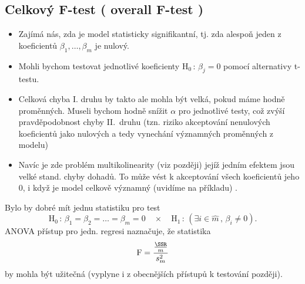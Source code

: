 \subsection{Celkový F-test ( overall F-test )}

\begin{itemize}
\item Zajímá nás, zda je model statisticky signifikantní, tj. zda alespoň jeden z koeficientů $ \beta_1 , \dots , \beta_m $ je nulový.
\item Mohli bychom testovat jednotlivé koeficienty $ \text{H}_0 \, : \, \beta_j = 0 $ pomocí alternativy t-testu.
\item Celková chyba I. druhu by takto ale mohla být velká, pokud máme hodně proměnných. Museli bychom hodně snížit $ \alpha $ pro jednotlivé testy, což zvýší pravděpodobnost chyby II.~druhu (tzn. riziko akceptování nenulových koeficientů jako nulových a tedy vynechání významných proměnných z modelu)
\item Navíc je zde problém multikolinearity (viz později) jejíž jedním efektem jsou velké stand. chyby dohadů. To může vést k akceptování všech koeficientů jeho 0, i když je model celkově významný (uvidíme na příkladu) .
\end{itemize}

Bylo by dobré mít jednu statistiku pro test
$$
\text{H}_0 \, : \, \beta_1 = \beta_2 = \dots = \beta_m = 0 \quad \times \quad \text{H}_1 \, : \, ( \exists i \in \widehat{m} \, , \, \beta_i \neq 0 ).
$$
ANOVA přístup pro jedn. regresi naznačuje, že statistika 
$$
\text{F} = \dfrac{\frac{\SSR}{m}}{s_m^{2}}
$$
by mohla být užitečná (vyplyne i z obecnějších přístupů k testování později).
